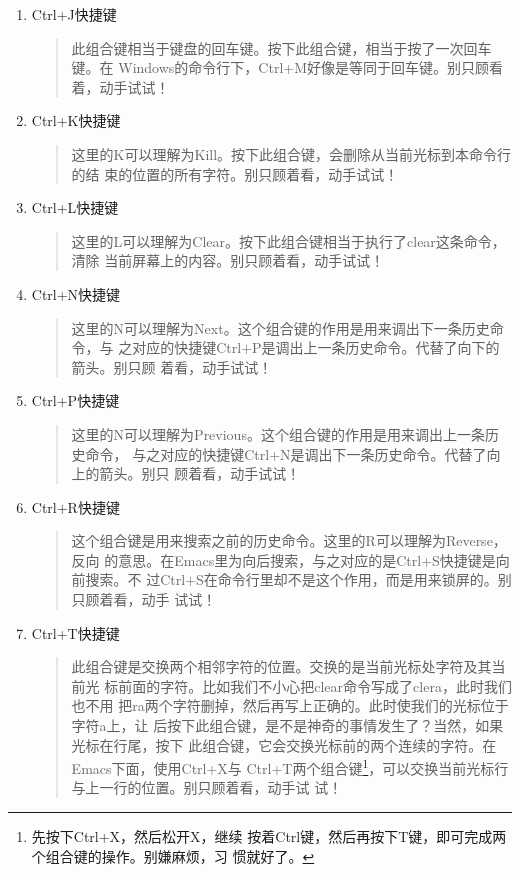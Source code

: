 \begin{enumerate}[itemsep=0pt,parsep=0pt]
\item Ctrl+J快捷键
  \begin{quote}
    此组合键相当于键盘的回车键。按下此组合键，相当于按了一次回车键。在
    Windows的命令行下，Ctrl+M好像是等同于回车键。别只顾看着，动手试试！
  \end{quote}

\item Ctrl+K快捷键
  \begin{quote}
    这里的K可以理解为Kill。按下此组合键，会删除从当前光标到本命令行的结
    束的位置的所有字符。别只顾着看，动手试试！
  \end{quote}

\item Ctrl+L快捷键
  \begin{quote}
    这里的L可以理解为Clear。按下此组合键相当于执行了clear这条命令，清除
    当前屏幕上的内容。别只顾着看，动手试试！
  \end{quote}

\item Ctrl+N快捷键
  \begin{quote}
    这里的N可以理解为Next。这个组合键的作用是用来调出下一条历史命令，与
    之对应的快捷键Ctrl+P是调出上一条历史命令。代替了向下的箭头。别只顾
    着看，动手试试！
  \end{quote}

\item Ctrl+P快捷键
  \begin{quote}
    这里的N可以理解为Previous。这个组合键的作用是用来调出上一条历史命令，
    与之对应的快捷键Ctrl+N是调出下一条历史命令。代替了向上的箭头。别只
    顾着看，动手试试！
  \end{quote}

\item Ctrl+R快捷键
  \begin{quote}
    这个组合键是用来搜索之前的历史命令。这里的R可以理解为Reverse，反向
    的意思。在Emacs里为向后搜索，与之对应的是Ctrl+S快捷键是向前搜索。不
    过Ctrl+S在命令行里却不是这个作用，而是用来锁屏的。别只顾着看，动手
    试试！
  \end{quote}

\item Ctrl+T快捷键
  \begin{quote}
    此组合键是交换两个相邻字符的位置。交换的是当前光标处字符及其当前光
    标前面的字符。比如我们不小心把clear命令写成了clera，此时我们也不用
    把ra两个字符删掉，然后再写上正确的。此时使我们的光标位于字符a上，让
    后按下此组合键，是不是神奇的事情发生了？当然，如果光标在行尾，按下
    此组合键，它会交换光标前的两个连续的字符。在Emacs下面，使用Ctrl+X与
    Ctrl+T两个组合键\footnote{先按下Ctrl+X，然后松开X，继续
      按着Ctrl键，然后再按下T键，即可完成两个组合键的操作。别嫌麻烦，习
      惯就好了。}，可以交换当前光标行与上一行的位置。别只顾着看，动手试
    试！
  \end{quote}


\end{enumerate}
